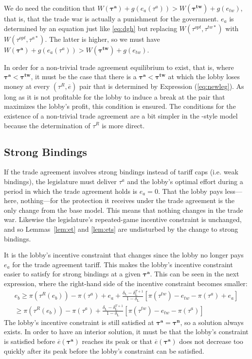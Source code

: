 \documentclass[authoryear, review]{elsarticle}
\newcommand{\ov}{\overline}
\newcommand{\bta}{\bm{\tau^a}}
\newcommand{\btn}{\bm{\tau^n}}
\newcommand{\btw}{\bm{\tau^{tw}}}
\newcommand{\de}{\delta}
\begin{document}
We do need the condition that $W(\bta) +g(e_a(\tau^a)) > W(\btw) + g(e_{tw})$, that is, that the trade war is actually a punishment for the government. $e_a$ is determined by an equation just like \ref{eq:dgh} but replacing $W(\tau^{opt},\tau^{tw*})$ with $W(\tau^{opt},\tau^{a*})$. The latter is higher, so we must have $W(\bta) +g(e_a(\tau^a)) > W(\btw) + g(e_{tw})$.

In order for a non-trivial trade agreement equilibrium to exist, that is, where $\bta < \btw$, it must be the case that there is a $\bta < \btw$ at which the lobby loses money at every $\left(\tau^R,\ov{e}\right)$ pair that is determined by Expression (\ref{eq:newleg}). As long as it is not profitable for the lobby to induce a break at the pair that maximizes the lobby's profit, this condition is ensured. The conditions for the existence of a non-trivial trade agreement are a bit simpler in the \citet{dgh97}-style model because the determination of $\tau^R$ is more direct.

\subsection{Strong Bindings}
\label{sec:strong}
If the trade agreement involves strong bindings instead of tariff caps (i.e. weak bindings), the legislature must deliver $\tau^a$ and the lobby's optimal effort during a period in which the trade agreement holds is $e_a = 0$. That the lobby pays less---here, nothing---for the protection it receives under the trade agreement is the only change from the base model. This means that nothing changes in the trade war. Likewise the legislature's repeated-game incentive constraint is unchanged, and so Lemmas~\ref{lem:et} and \ref{lem:ets} are undisturbed by the change to strong bindings.

It is the lobby's incentive constraint that changes since the lobby no longer pays $e_a$ for the trade agreement tariff. This makes the lobby's incentive constraint easier to satisfy for strong bindings at a given $\bta$. This can be seen in the next expression, where the right-hand side of the incentive constraint becomes smaller:
\begin{multline*}
	e_b \geq \pi(\tau^R(e_b)) - \pi(\tau^a) + e_a + \frac{\de_\text{L} - \de_\text{L}^{T+1}}{1-\de_\text{L}} \left[\pi(\tau^{tw}) -e_{tw} - \pi(\tau^a) + e_a\right] \\
		\geq \pi(\tau^R(e_b)) - \pi(\tau^a) + \frac{\de_\text{L} - \de_\text{L}^{T+1}}{1-\de_\text{L}} \left[\pi(\tau^{tw}) -e_{tw} - \pi(\tau^a) \right]
\end{multline*}
The lobby's incentive constraint is still satisfied at $\bta = \btn$, so a solution always exists. In order to have an interior solution, it must be that the lobby's constraint is satisfied before $\ov{e}(\bta)$ reaches its peak or that $\ov{e}(\bta)$ does not decrease too quickly after its peak before the lobby's constraint can be satisfied.
\end{document}
